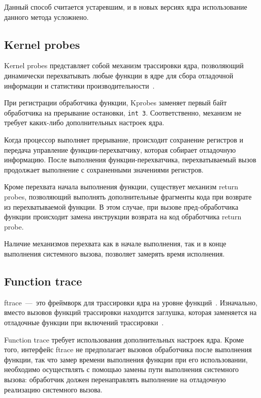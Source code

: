 Данный способ считается устаревшим, и в новых версиях ядра использование данного метода усложнено.

\subsection{Kernel probes}

Kernel probes представляет собой механизм трассировки ядра, позволяющий динамически перехватывать любые функции в ядре для сбора отладочной информации и статистики производительности~\cite{kprobes}. 

При регистрации обработчика функции, Kprobes заменяет первый байт обработчика на прерывание остановки, \texttt{int 3}. Соответственно, механизм не требует каких-либо дополнительных настроек ядра. 

Когда процессор выполняет прерывание, происходит сохранение регистров и передача управление функции-перехватчику, которая собирает отладочную информацию. После выполнения функции-перехватчика, перехватываемый вызов продолжает выполнение с сохраненными значениями регистров.

Кроме перехвата начала выполнения функции, существует механизм return probes, позволяющий выполнять дополнительные фрагменты кода при возврате из перехватываемой функции. В этом случае, при вызове пред-обработчика функции происходит замена инструкции возврата на код обработчика return probe.

Наличие механизмов перехвата как в начале выполнения, так и в конце выполнения системного вызова, позволяет замерять время исполнения.

\subsection{Function trace}

ftrace~---~это фреймворк для трассировки ядра на уровне функций~\cite{ftrace}. Изначально, вместо вызовов функций трассировки находится заглушка, которая заменяется на отладочные функции при включений трассировки~\cite{ftrace_design}.

Function trace требует использования дополнительных настроек ядра. Кроме того, интерфейс ftrace не предполагает вызовов обработчика после выполнения функции, так что замер времени выполнения функции при его использовании, необходимо осуществлять с помощью замены пути выполнения системного вызова: обработчик должен перенаправлять выполнение на отладочную реализацию системного вызова.



